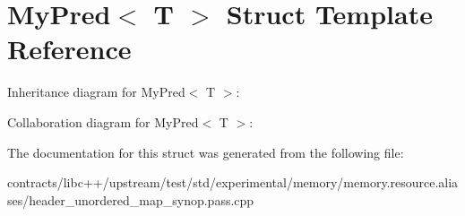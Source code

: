 \hypertarget{struct_my_pred}{}\section{My\+Pred$<$ T $>$ Struct Template Reference}
\label{struct_my_pred}


Inheritance diagram for My\+Pred$<$ T $>$\+:


Collaboration diagram for My\+Pred$<$ T $>$\+:


The documentation for this struct was generated from the following file\+:\begin{DoxyCompactItemize}
\item 
contracts/libc++/upstream/test/std/experimental/memory/memory.\+resource.\+aliases/header\+\_\+unordered\+\_\+map\+\_\+synop.\+pass.\+cpp\end{DoxyCompactItemize}
